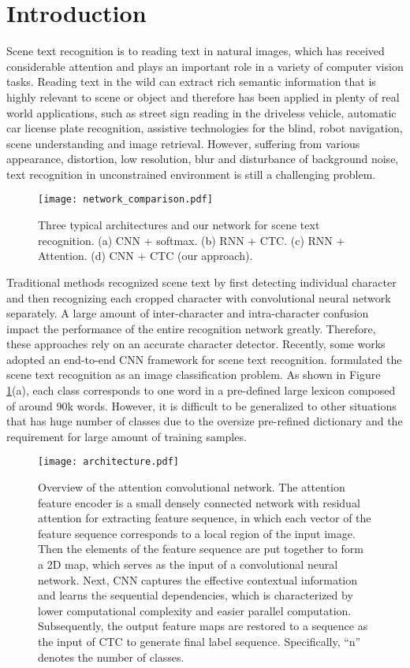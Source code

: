 \documentclass[letterpaper]{article} %
\begin{document}
\section{Introduction}
Scene text recognition is to reading text in natural images, which has received considerable attention and plays an important role in a variety of computer vision tasks. Reading text in the wild can extract rich semantic information that is highly relevant to scene or object and therefore has been applied in plenty of real world applications, such as street sign reading in the driveless vehicle, automatic car license plate recognition, assistive technologies for the blind, robot navigation, scene understanding and image retrieval. However, suffering from various appearance, distortion, low resolution, blur and disturbance of background noise, text recognition in unconstrained environment is still a challenging problem.\par
\begin{figure}
\centering
\texttt{[image: network\_comparison.pdf]}
\caption{Three typical architectures and our network for scene text recognition. (a) CNN + softmax. (b) RNN + CTC. (c) RNN + Attention. (d) CNN + CTC (our approach).}
\label{fig:picture001}
\end{figure}


Traditional methods \cite{wang2011end,bissacco2013photoocr,mishra2012top} recognized scene text by first detecting individual character and then recognizing each cropped character with convolutional neural network separately. A large amount of inter-character and intra-character confusion impact the performance of the entire recognition network greatly. Therefore, these approaches rely on an accurate character detector. Recently, some works adopted an end-to-end CNN framework for scene text recognition. \cite{jaderberg2016reading} formulated the scene text recognition as an image classification problem. As shown in Figure \ref{fig:picture001}(a), each class corresponds to one word in a pre-defined large lexicon composed of around 90k words. However, it is difficult to be generalized to other situations that has huge number of classes due to the oversize pre-refined dictionary and the requirement for large amount of training samples.\par

\begin{figure*}
\centering
\texttt{[image: architecture.pdf]}
\caption{Overview of the attention convolutional network. The attention feature encoder is a small densely connected network with residual attention for extracting feature sequence, in which each vector of the feature sequence corresponds to a local region of the input image. Then the elements of the feature sequence are put together to form a 2D map, which serves as the input of a convolutional neural network. Next, CNN captures the effective contextual information and learns the sequential dependencies, which is characterized by lower computational complexity and easier parallel computation. Subsequently, the output feature maps are restored to a sequence as the input of CTC to generate final label sequence. Specifically, ``n'' denotes the number of classes.}
\label{fig:picture002}
\end{figure*}
\end{document}
